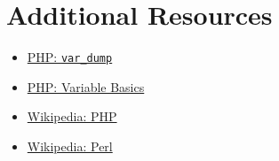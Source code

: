 \section{Additional Resources}

\begin{itemize}[leftmargin=*]
    \item \href{https://www.php.net/manual/en/function.var-dump.php}{PHP: \texttt{var\_dump}}
    \item \href{http://php.net/manual/en/language.variables.basics.php}{PHP: Variable Basics}
    \item \href{https://en.wikipedia.org/wiki/PHP}{Wikipedia: PHP}
    \item \href{https://en.wikipedia.org/wiki/Perl}{Wikipedia: Perl}
\end{itemize}
